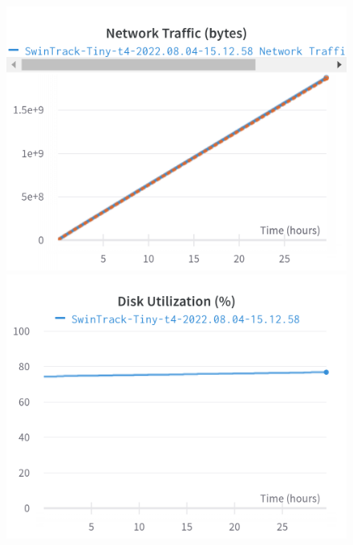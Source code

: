 \documentclass{article}
\begin{document}
\begin{figure}[h]
\includegraphics[width=\linewidth]{charts/Section-4-Panel-12-kcqbrsr30}
\caption{}
\endminipage\hfill
{}
\includegraphics[width=\linewidth]{charts/Section-4-Panel-13-dsnuwstqj}
\caption{}
\endminipage
\end{figure}
\end{document}
